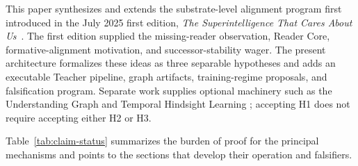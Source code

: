 \documentclass[11pt]{article}
\begin{document}
This paper synthesizes and extends the substrate-level alignment program first
introduced in the July 2025 first edition, \emph{The Superintelligence That
Cares About Us}~\cite{westerberg2025superintelligence}.
The first edition supplied the missing-reader observation, Reader Core, formative-alignment motivation, and successor-stability wager. The present architecture formalizes these ideas as three separable hypotheses and adds an executable Teacher pipeline, graph artifacts, training-regime proposals, and falsification program. Separate work supplies optional machinery such as the Understanding Graph and Temporal Hindsight Learning \cite{westerberg2026understanding,westerberg2026thl}; accepting H1 does not require accepting either H2 or H3.

Table~\ref{tab:claim-status} summarizes the burden of proof for the principal
mechanisms and points to the sections that develop their operation and
falsifiers.
\end{document}

